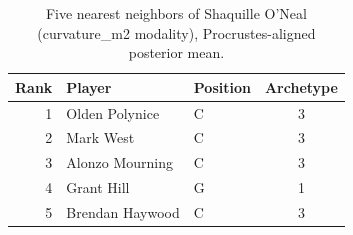 \begin{table}[htbp]
  \centering\small
  \begin{tabular}{rllc}
    \toprule
    Rank & Player & Position & Archetype \\
    \midrule
    1 & Olden Polynice & C & 3 \\
    2 & Mark West & C & 3 \\
    3 & Alonzo Mourning & C & 3 \\
    4 & Grant Hill & G & 1 \\
    5 & Brendan Haywood & C & 3 \\
    \bottomrule
  \end{tabular}
  \caption{Five nearest neighbors of Shaquille O'Neal (curvature_m2 modality), Procrustes-aligned posterior mean.}
  \label{tab:Shaquille_O_Neal_neighbors_curvature_m2}
\end{table}

